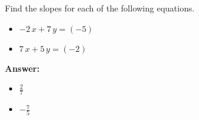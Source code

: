  Find the slopes for each of the following equations. \begin{itemize}\item \( -2 \, x + 7 \, y = \left(-5\right) \)\item \( 7 \, x + 5 \, y = \left(-2\right) \)\end{itemize}

        \textbf{Answer:} \begin{itemize}\item \( \frac{2}{7} \)\item \( -\frac{7}{5} \)\end{itemize}
